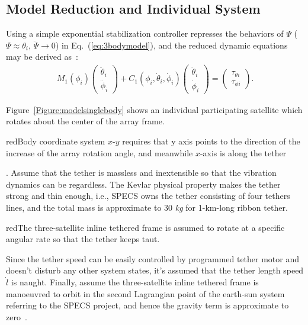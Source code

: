 \subsection{Model Reduction and Individual System}
Using a simple exponential stabilization controller represses the behaviors of $\Psi$ ($\Psi\approx\theta_i$, $\ddot\Psi\rightarrow 0$) in Eq.~(\ref{eq:3bodymodel}), and the reduced dynamic equations may be derived as~\cite{chung2007nonlinear,huang2015nonlinear}:
\begin{align}
M_1(\phi_i)
\begin{pmatrix}
\ddot{\theta}_i\\
\ddot{\phi}_i
\end{pmatrix}
+C_1(\phi_i,\dot{\theta}_i,\dot{\phi}_i)
\begin{pmatrix}
\dot{\theta}_i\\
\dot{\phi}_i
\end{pmatrix}
=
\begin{pmatrix}
\tau_{\theta i}\\
\tau_{\phi i}
\end{pmatrix}.\label{eq:3bodyreduce}
\end{align}\par
Figure~\ref{Figure:modelsinglebody} shows an individual participating satellite which rotates about the center of the array frame. \begin{color}{red}Body coordinate system $x$-$y$ requires that y axis points to the direction of the increase of the array rotation angle, and meanwhile $x$-axis is along the tether\end{color}. Assume that the tether is massless and inextensible so that the vibration dynamics can be regardless. The Kevlar physical property makes the tether strong and thin enough, i.e., SPECS owns the tether consisting of four tethers lines, and the total mass is approximate to 30 \textit{kg} for 1-km-long ribbon tether\cite{chung2007nonlinear1}. \begin{color}{red}The three-satellite inline tethered frame is assumed to rotate at a specific angular rate so that the tether keeps taut.\end{color} Since the tether speed can be easily controlled by programmed tether motor and doesn't disturb any other system states, it's assumed that the tether length speed $\dot l$ is naught. Finally, assume the three-satellite inline tethered frame is manoeuvred to orbit in the second Lagrangian point of the earth-sun system referring to the SPECS project, and hence the gravity term is approximate to zero~\cite{lorenzini2006far}.\par
